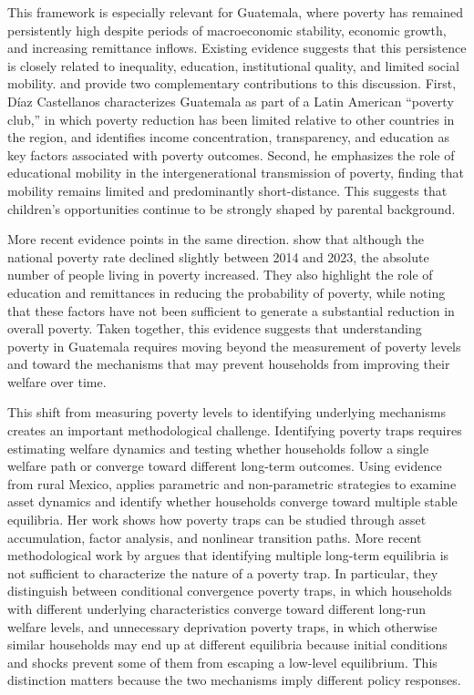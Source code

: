 \documentclass{article}
\begin{document}
This framework is especially relevant for Guatemala, where poverty has remained persistently high despite periods of macroeconomic stability, economic growth, and increasing remittance inflows. Existing evidence suggests that this persistence is closely related to inequality, education, institutional quality, and limited social mobility. \textcite{diazcastellanos2018} and \textcite{diazcastellanos2019} provide two complementary contributions to this discussion. First, Díaz Castellanos characterizes Guatemala as part of a Latin American ``poverty club,'' in which poverty reduction has been limited relative to other countries in the region, and identifies income concentration, transparency, and education as key factors associated with poverty outcomes. Second, he emphasizes the role of educational mobility in the intergenerational transmission of poverty, finding that mobility remains limited and predominantly short-distance. This suggests that children's opportunities continue to be strongly shaped by parental background.

More recent evidence points in the same direction. \textcite{diazcastellanos2024} show that although the national poverty rate declined slightly between 2014 and 2023, the absolute number of people living in poverty increased. They also highlight the role of education and remittances in reducing the probability of poverty, while noting that these factors have not been sufficient to generate a substantial reduction in overall poverty. Taken together, this evidence suggests that understanding poverty in Guatemala requires moving beyond the measurement of poverty levels and toward the mechanisms that may prevent households from improving their welfare over time.

This shift from measuring poverty levels to identifying underlying mechanisms creates an important methodological challenge. Identifying poverty traps requires estimating welfare dynamics and testing whether households follow a single welfare path or converge toward different long-term outcomes. Using evidence from rural Mexico, \textcite{chiodi2009} applies parametric and non-parametric strategies to examine asset dynamics and identify whether households converge toward multiple stable equilibria. Her work shows how poverty traps can be studied through asset accumulation, factor analysis, and nonlinear transition paths. More recent methodological work by \textcite{alloush2023} argues that identifying multiple long-term equilibria is not sufficient to characterize the nature of a poverty trap. In particular, they distinguish between conditional convergence poverty traps, in which households with different underlying characteristics converge toward different long-run welfare levels, and unnecessary deprivation poverty traps, in which otherwise similar households may end up at different equilibria because initial conditions and shocks prevent some of them from escaping a low-level equilibrium. This distinction matters because the two mechanisms imply different policy responses.
\end{document}
